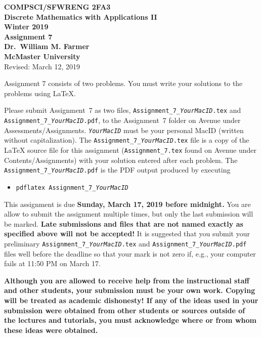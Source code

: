 \documentclass[11pt,fleqn]{article}
\begin{document}
\begin{center}

  {\large \textbf{COMPSCI/SFWRENG 2FA3}}\\[2mm]
  {\large \textbf{Discrete Mathematics with Applications II}}\\[2mm]
  {\large \textbf{Winter 2019}}\\[8mm]
  {\huge \textbf{Assignment 7}}\\[6mm]
  {\large \textbf{Dr.~William M. Farmer}}\\[2mm]
  {\large \textbf{McMaster University}}\\[6mm]
  {\large Revised: March 12, 2019}

\end{center}

\medskip

Assignment 7 consists of two problems.  You must write your solutions
to the problems using LaTeX.

Please submit Assignment~7 as two files,
\texttt{Assignment\_7\_\emph{YourMacID}.tex} and
\texttt{Assignment\_7\_\emph{YourMacID}.pdf}, to the Assignment~7
folder on Avenue under Assessments/Assignments.
\texttt{\emph{YourMacID}} must be your personal MacID (written without
capitalization).  The \texttt{Assignment\_7\_\emph{YourMacID}.tex}
file is a copy of the LaTeX source file for this assignment
(\texttt{Assignment\_7.tex} found on Avenue under
Contents/Assignments) with your solution entered after each problem.
The \texttt{Assignment\_7\_\emph{YourMacID}.pdf} is the PDF output
produced by executing

\begin{itemize}

  \item[] \texttt{pdflatex Assignment\_7\_\emph{YourMacID}}

\end{itemize}

This assignment is due \textbf{Sunday, March 17, 2019 before
  midnight.}  You are allow to submit the assignment multiple times,
but only the last submission will be marked.  \textbf{Late submissions
  and files that are not named exactly as specified above will not be
  accepted!}  It is suggested that you submit your preliminary
\texttt{Assignment\_7\_\emph{YourMacID}.tex} and
\texttt{Assignment\_7\_\emph{YourMacID}.pdf} files well before the
deadline so that your mark is not zero if, e.g., your computer fails
at 11:50 PM on March 17.

\textbf{Although you are allowed to receive help from the
  instructional staff and other students, your submission must be your
  own work.  Copying will be treated as academic dishonesty! If any of
  the ideas used in your submission were obtained from other students
  or sources outside of the lectures and tutorials, you must
  acknowledge where or from whom these ideas were obtained.}
\end{document}
